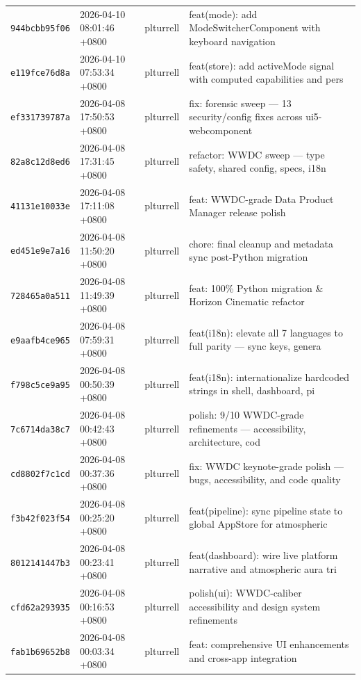 \documentclass[11pt,a4paper]{article}
\begin{document}
\begin{longtable}{|p{2.2cm}|p{3.2cm}|l|p{6cm}|}
\texttt{944bcbb95f06} & 2026-04-10 08:01:46 +0800 & plturrell & feat(mode): add ModeSwitcherComponent with keyboard navigation \\
\texttt{e119fce76d8a} & 2026-04-10 07:53:34 +0800 & plturrell & feat(store): add activeMode signal with computed capabilities and pers \\
\texttt{ef331739787a} & 2026-04-08 17:50:53 +0800 & plturrell & fix: forensic sweep — 13 security/config fixes across ui5-webcomponent \\
\texttt{82a8c12d8ed6} & 2026-04-08 17:31:45 +0800 & plturrell & refactor: WWDC sweep — type safety, shared config, specs, i18n \\
\texttt{41131e10033e} & 2026-04-08 17:11:08 +0800 & plturrell & feat: WWDC-grade Data Product Manager release polish \\
\texttt{ed451e9e7a16} & 2026-04-08 11:50:20 +0800 & plturrell & chore: final cleanup and metadata sync post-Python migration \\
\texttt{728465a0a511} & 2026-04-08 11:49:39 +0800 & plturrell & feat: 100\% Python migration \& Horizon Cinematic refactor \\
\texttt{e9aafb4ce965} & 2026-04-08 07:59:31 +0800 & plturrell & feat(i18n): elevate all 7 languages to full parity — sync keys, genera \\
\texttt{f798c5ce9a95} & 2026-04-08 00:50:39 +0800 & plturrell & feat(i18n): internationalize hardcoded strings in shell, dashboard, pi \\
\texttt{7c6714da38c7} & 2026-04-08 00:42:43 +0800 & plturrell & polish: 9/10 WWDC-grade refinements — accessibility, architecture, cod \\
\texttt{cd8802f7c1cd} & 2026-04-08 00:37:36 +0800 & plturrell & fix: WWDC keynote-grade polish — bugs, accessibility, and code quality \\
\texttt{f3b42f023f54} & 2026-04-08 00:25:20 +0800 & plturrell & feat(pipeline): sync pipeline state to global AppStore for atmospheric \\
\texttt{8012141447b3} & 2026-04-08 00:23:41 +0800 & plturrell & feat(dashboard): wire live platform narrative and atmospheric aura tri \\
\texttt{cfd62a293935} & 2026-04-08 00:16:53 +0800 & plturrell & polish(ui): WWDC-caliber accessibility and design system refinements \\
\texttt{fab1b69652b8} & 2026-04-08 00:03:34 +0800 & plturrell & feat: comprehensive UI enhancements and cross-app integration \\

\end{longtable}
\end{document}
